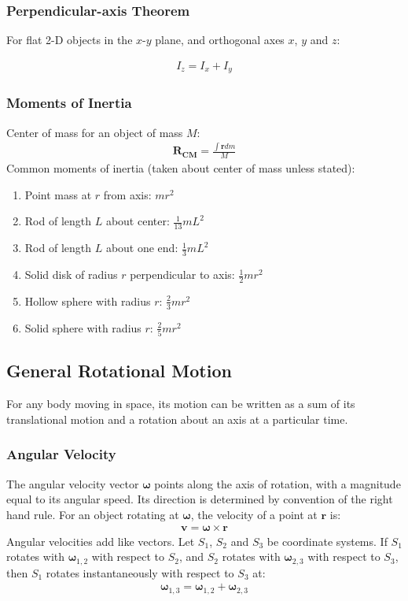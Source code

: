 \documentclass[11pt]{article}
\newcommand{\ve}[1]{
  \ensuremath{\bm{#1}}}	               %
\begin{document}
\begin{multicols*}{3}
\subsubsection{Perpendicular-axis Theorem}
For flat 2-D objects in the $x$-$y$ plane, and orthogonal axes $x$, $y$ and $z$:

\begin{align*}
  I_z=I_x+I_y
\end{align*}
\subsubsection{Moments of Inertia}
Center of mass for an object of mass $M$:
\begin{align*}
  \ve{R_\text{CM}}=\frac{\int\ve{r}dm}{M}
\end{align*}
Common moments of inertia (taken about center of mass unless stated):
\begin{enumerate}
  \setlength{\itemsep}{2mm}
\item Point mass at $r$ from axis: $mr^2$
\item Rod of length $L$ about center: $\frac{1}{13}mL^2$
\item Rod of length $L$ about one end: $\frac{1}{3}mL^2$
\item Solid disk of radius $r$ perpendicular to axis: $\frac{1}{2}mr^2$
\item Hollow sphere with radius $r$: $\frac{2}{3}mr^2$
\item Solid sphere with radius $r$: $\frac{2}{5}mr^2$
\end{enumerate}

\subsection{General Rotational Motion}
For any body moving in space, its motion can be written as a sum of its translational motion and a rotation about an axis at a particular time. 

\subsubsection{Angular Velocity}
The angular velocity vector $\ve{\omega}$ points along the axis of rotation, with a  magnitude equal to its angular speed. Its direction is determined by convention of the right hand rule. For an object rotating at $\ve{\omega}$, the velocity of a point at $\ve{r}$ is:
\begin{align*}
  \ve{v} = \ve{\omega} \times \ve{r}
\end{align*}
Angular velocities add like vectors. Let $S_1$, $S_2$ and $S_3$ be coordinate systems. If $S_1$ rotates with $\ve{\omega}_{1, 2}$ with respect to $S_2$, and $S_2$ rotates with $\ve{\omega}_{2, 3}$ with respect to $S_3$, then $S_1$ rotates instantaneously with respect to $S_3$ at: 
\begin{align*}
  \ve{\omega}_{1, 3} = \ve{\omega}_{1, 2} + \ve{\omega}_{2, 3}
\end{align*}


\end{multicols*}
\end{document}
